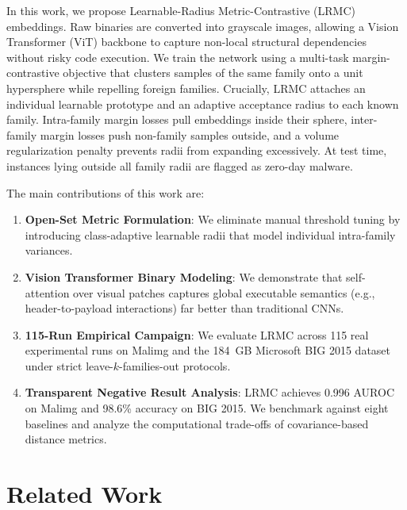 \documentclass[conference]{IEEEtran}
\begin{document}
In this work, we propose Learnable-Radius Metric-Contrastive (LRMC) embeddings. Raw binaries are converted into grayscale images, allowing a Vision Transformer (ViT) \cite{dosovitskiy2020} backbone to capture non-local structural dependencies without risky code execution. We train the network using a multi-task margin-contrastive objective that clusters samples of the same family onto a unit hypersphere while repelling foreign families. Crucially, LRMC attaches an individual learnable prototype and an adaptive acceptance radius to each known family. Intra-family margin losses pull embeddings inside their sphere, inter-family margin losses push non-family samples outside, and a volume regularization penalty prevents radii from expanding excessively. At test time, instances lying outside all family radii are flagged as zero-day malware.

The main contributions of this work are:
\begin{enumerate}
    \item \textbf{Open-Set Metric Formulation}: We eliminate manual threshold tuning by introducing class-adaptive learnable radii that model individual intra-family variances.
    \item \textbf{Vision Transformer Binary Modeling}: We demonstrate that self-attention over visual patches captures global executable semantics (e.g., header-to-payload interactions) far better than traditional CNNs.
    \item \textbf{115-Run Empirical Campaign}: We evaluate LRMC across 115 real experimental runs on Malimg and the 184~GB Microsoft BIG 2015 dataset under strict leave-$k$-families-out protocols.
    \item \textbf{Transparent Negative Result Analysis}: LRMC achieves 0.996 AUROC on Malimg and 98.6\% accuracy on BIG 2015. We benchmark against eight baselines and analyze the computational trade-offs of covariance-based distance metrics.
\end{enumerate}

\section{Related Work}
\end{document}
